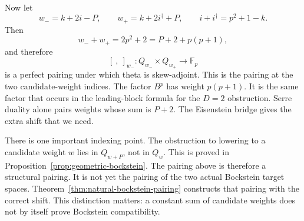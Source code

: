 Now let
\[
 w_-=k+2i-P,
 \qquad
 w_+=k+2i^\dagger+P,
 \qquad
 i+i^\dagger=p^2+1-k.
\]
Then
\[
 w_-+w_+=2p^2+2=P+2+p(p+1),
\]
and therefore
\[
 [\ ,\ ]_{w_-}:Q_{w_-}\times Q_{w_+}\longrightarrow\mathbb F_p
\]
is a perfect pairing under which theta is skew-adjoint.  This is the pairing
at the two candidate-weight indices.  The factor $B^p$ has weight $p(p+1)$.
It is the same factor that occurs in the leading-block formula for the $D=2$
obstruction.  Serre duality alone pairs weights whose sum is $P+2$.  The
Eisenstein bridge gives the extra shift that we need.

There is one important indexing point.  The obstruction to lowering to a
candidate weight $w$ lies in $Q_{w+P}$, not in $Q_w$.  This is proved in
Proposition~\ref{prop:geometric-bockstein}.  The pairing above is therefore a
structural pairing.  It is not yet the pairing of the two actual Bockstein
target spaces.  Theorem~\ref{thm:natural-bockstein-pairing} constructs that
pairing with the correct shift.  This distinction matters: a constant sum of
candidate weights does not by itself prove Bockstein compatibility.
